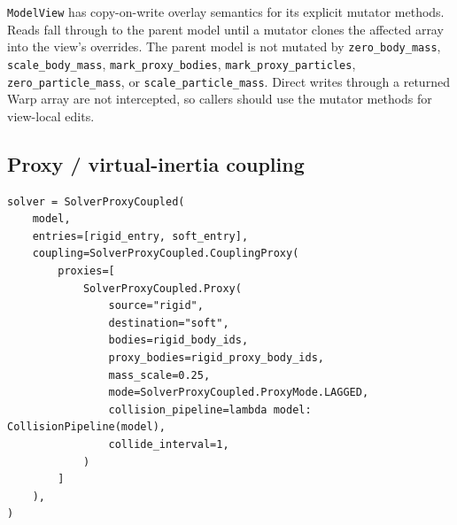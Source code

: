 \documentclass[11pt]{article}
\begin{document}
\texttt{ModelView} has copy-on-write overlay semantics for its explicit mutator
methods. Reads fall through to the parent model until a mutator clones the affected
array into the view's overrides. The parent model is not mutated by
\texttt{zero\_body\_mass}, \texttt{scale\_body\_mass},
\texttt{mark\_proxy\_bodies}, \texttt{mark\_proxy\_particles},
\texttt{zero\_particle\_mass}, or \texttt{scale\_particle\_mass}. Direct writes
through a returned Warp array are not intercepted, so callers should use the mutator
methods for view-local edits.

\subsection{Proxy / virtual-inertia coupling}

\begin{verbatim}
solver = SolverProxyCoupled(
    model,
    entries=[rigid_entry, soft_entry],
    coupling=SolverProxyCoupled.CouplingProxy(
        proxies=[
            SolverProxyCoupled.Proxy(
                source="rigid",
                destination="soft",
                bodies=rigid_body_ids,
                proxy_bodies=rigid_proxy_body_ids,
                mass_scale=0.25,
                mode=SolverProxyCoupled.ProxyMode.LAGGED,
                collision_pipeline=lambda model: CollisionPipeline(model),
                collide_interval=1,
            )
        ]
    ),
)
\end{verbatim}
\end{document}
